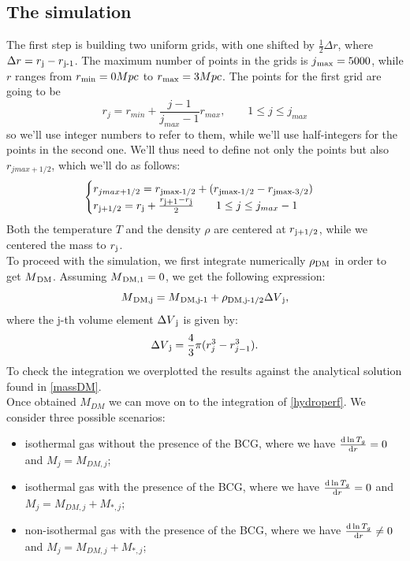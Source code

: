\documentclass{article}
\begin{document}
\subsection{The simulation}
The first step is building two uniform grids, with one shifted by $\frac{1}{2}\Delta r$, where $\Delta r=r\textsubscript{j}-r\textsubscript{j-1}$. The maximum number of points in the grids is $j\textsubscript{max}=5000$, while $r$ ranges from $r\textsubscript{min}=0 Mpc$ to $r\textsubscript{max}=3 Mpc$.
The points for the first grid are going to be
\begin{equation}
	r_{j}=r_{min}+\frac{j-1}{j_{max}-1}r_{max},\qquad 1\le j\le j_{max}
\end{equation}
so we'll use integer numbers to refer to them, while we'll use half-integers for the points in the second one.
We'll thus need to define not only the points but also $r_{jmax+1/2}$, which we'll do as follows:
\begin{equation}
	\begin{cases}
		r_{jmax+1/2}=r\textsubscript{jmax-1/2}+(r\textsubscript{jmax-1/2}-r\textsubscript{jmax-3/2})\\
		r\textsubscript{j+1/2}=r\textsubscript{j}+\frac{r\textsubscript{j+1}-r\textsubscript{j}}{2} \qquad 1\le j\le j_{max}-1
	\end{cases}
\end{equation}
Both the temperature $T$ and the density $\rho$ are centered at $r\textsubscript{j+1/2}$, while we centered the mass to $r\textsubscript{j}$.\\
To proceed with the simulation, we first integrate numerically $\rho\textsubscript{DM}$ in order to get $M\textsubscript{DM}$.
Assuming $ M\textsubscript{DM,1}=0$, we get the following expression:
\begin{equation}
	M\textsubscript{DM,j}=M\textsubscript{DM,j-1}+\rho\textsubscript{DM,j-1/2}\Delta V\textsubscript{j},
\end{equation}
where the j-th volume element $\Delta V\textsubscript{j}$ is given by:
\begin{equation}
	\Delta V\textsubscript{j}=\frac{4}{3}\pi(r^{3}_{j}-r^{3}_{j-1}).
\end{equation}
To check the integration we overplotted the results against the analytical solution found in \eqref{massDM}.\\
Once obtained $M_{DM}$ we can move on to the integration of \eqref{hydroperf}. We consider three possible scenarios:
\begin{itemize}
	\item isothermal gas without the presence of the BCG, where we have $\derivative{\ln T_{g}}{r}=0$ and $M_{j}=M_{DM,j}$;
	\item isothermal gas with the presence of the BCG, where we have $\derivative{\ln T_{g}}{r}=0$ and $M_{j}=M_{DM,j}+M_{*,j}$;
	\item non-isothermal gas with the presence of the BCG, where we have $\derivative{\ln T_{g}}{r}\ne 0$ and $M_{j}=M_{DM,j}+M_{*,j}$;
\end{itemize}
\end{document}
